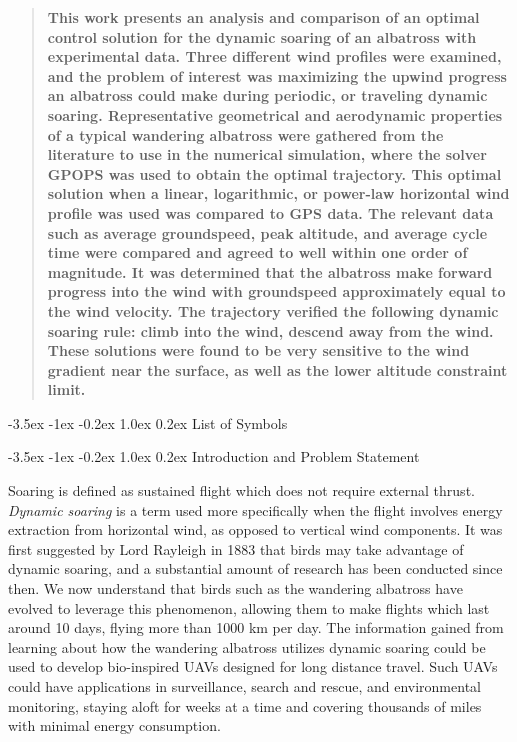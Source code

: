 \documentclass[11pt,letterpaper,onecolumn]{article}
\makeatletter
\renewcommand\section{\@startsection{section}{1}{\z@}%
 {-3.5ex \@plus-1ex \@minus-0.2ex}%
 {1.0ex \@plus0.2ex}%
 {\fontsize{12pt}{12pt}\selectfont\bfseries\sffamily}}
\def\listofsymbols{}
\makeatother
\begin{document}
\begin{abstract}
  \textbf{
    This work presents an analysis and comparison of an optimal control solution for the dynamic soaring of an albatross with experimental data.
    Three different wind profiles were examined, and the problem of interest was maximizing the upwind progress an albatross could make during periodic, or traveling dynamic soaring.
    Representative geometrical and aerodynamic properties of a typical wandering albatross were gathered from the literature to use in the numerical simulation, where the solver GPOPS was used to obtain the optimal trajectory.
    This optimal solution when a linear, logarithmic, or power-law horizontal wind profile was used was compared to GPS data.
    The relevant data such as average groundspeed, peak altitude, and average cycle time were compared and agreed to well within one order of magnitude.
    It was determined that the albatross make forward progress into the wind with groundspeed approximately equal to the wind velocity.
    The trajectory verified the following dynamic soaring rule: climb into the wind, descend away from the wind.
    These solutions were found to be very sensitive to the wind gradient near the surface, as well as the lower altitude constraint limit.
  }
\end{abstract}

\section{List of Symbols}

\listofsymbols%

\section{Introduction and Problem Statement}

Soaring is defined as sustained flight which does not require external thrust.
\textit{Dynamic soaring} is a term used more specifically when the flight involves energy extraction from horizontal wind, as opposed to vertical wind components.
It was first suggested by Lord Rayleigh in 1883 that birds may take advantage of dynamic soaring, and a substantial amount of research has been conducted since then.\cite{rayleigh.soaring.1883} We now understand that birds such as the wandering albatross have evolved to leverage this phenomenon, allowing them to make flights which last around 10 days, flying more than 1000 km per day.
The information gained from learning about how the wandering albatross utilizes dynamic soaring could be used to develop bio-inspired UAVs designed for long distance travel.
Such UAVs could have applications in surveillance, search and rescue, and environmental monitoring, staying aloft for weeks at a time and covering thousands of miles with minimal energy consumption\cite{richardson.highspeedrobotic.2012}.
\end{document}
